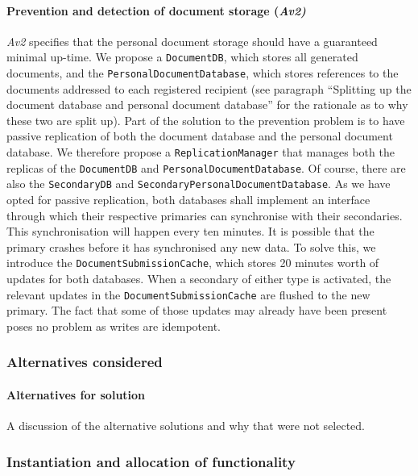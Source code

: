 \documentclass[a4paper,10pt]{article}
\begin{document}
\paragraph{Prevention and detection of document storage (\emph{Av2)}}
\emph{Av2} specifies that the personal document storage should have a guaranteed minimal up-time. We propose a \texttt{DocumentDB}, which stores all generated documents, and the \texttt{PersonalDocumentDatabase}, which stores references to the documents addressed to each registered recipient (see paragraph ``Splitting up the document database and personal document database'' for the rationale as to why these two are split up). Part of the solution to the prevention problem is to have passive replication of both the document database and the personal document database. We therefore propose a \texttt{ReplicationManager} that manages both the replicas of the \texttt{DocumentDB} and \texttt{PersonalDocumentDatabase}. Of course, there are also the \texttt{SecondaryDB} and \texttt{SecondaryPersonalDocumentDatabase}. As we have opted for passive replication, both databases shall implement an interface through which their respective primaries can synchronise with their secondaries. This synchronisation will happen every ten minutes. It is possible that the primary crashes before it has synchronised any new data. To solve this, we introduce the \texttt{DocumentSubmissionCache}, which stores 20 minutes worth of updates for both databases. When a secondary of either type is activated, the relevant updates in the \texttt{DocumentSubmissionCache} are flushed to the new primary. The fact that some of those updates may already have been present poses no problem as writes are idempotent.

\subsubsection*{Alternatives considered}
\paragraph{Alternatives for solution}
A discussion of the alternative solutions and why that were not selected.

\subsubsection{Instantiation and allocation of functionality}
\end{document}
